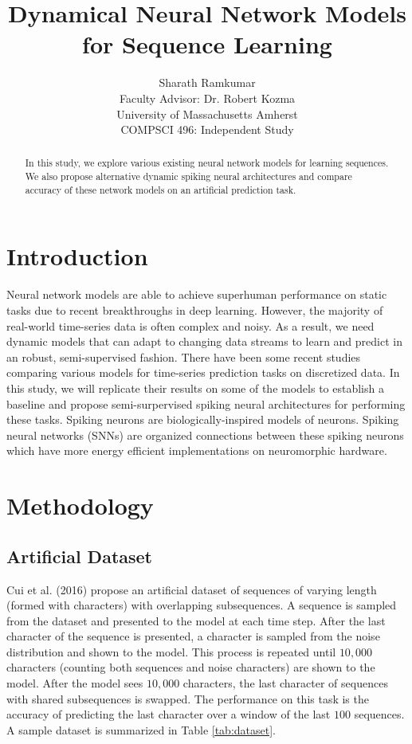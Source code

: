 \documentclass{article}
\title{Dynamical Neural Network Models\\for Sequence Learning}
\author{Sharath Ramkumar\\
Faculty Advisor: Dr. Robert Kozma\\University of Massachusetts Amherst\\COMPSCI 496: Independent Study}
\date{}
\begin{document}
\maketitle

\begin{abstract}
In this study, we explore various existing neural network models for learning sequences. We also propose alternative dynamic spiking neural architectures and compare accuracy of these network models on an artificial prediction task.
\end{abstract}

\section*{Introduction}

Neural network models are able to achieve superhuman performance on static tasks due to recent breakthroughs in deep learning. However, the majority of real-world time-series data is often complex and noisy. As a result, we need dynamic models that can adapt to changing data streams to learn and predict in an robust, semi-supervised fashion. There have been some recent studies comparing various models for time-series prediction tasks \cite{cui2016continuous} on discretized data. In this study, we will replicate their results on some of the models to establish a baseline and propose semi-surpervised spiking neural architectures for performing these tasks. Spiking neurons \cite{gerstner2002spiking} are biologically-inspired models of neurons. Spiking neural networks (SNNs) \cite{maass1997networks} are organized connections between these spiking neurons which have more energy efficient \cite{cruz2012energy} implementations on neuromorphic hardware.

\section*{Methodology}

\subsection*{Artificial Dataset}

Cui et al. (2016) propose an artificial dataset of sequences of varying length (formed with characters) with overlapping subsequences. A sequence is sampled from the dataset and presented to the model at each time step. After the last character of the sequence is presented, a character is sampled from the noise distribution and shown to the model. This process is repeated until $10,000$ characters (counting both sequences and noise characters) are shown to the model. After the model sees $10,000$ characters, the last character of sequences with shared subsequences is swapped. The performance on this task is the accuracy of predicting the last character over a window of the last $100$ sequences. A sample dataset is summarized in Table \ref{tab:dataset}.
\end{document}
